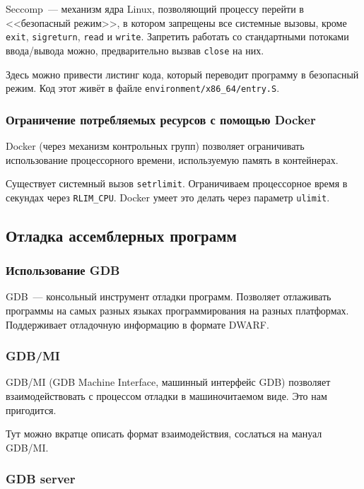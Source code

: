 \documentclass[a4paper,article,14pt]{extarticle}
\begin{document}
Seccomp~--- механизм ядра Linux, позволяющий процессу перейти в <<безопасный режим>>, в котором запрещены все системные вызовы, кроме \texttt{exit}, \texttt{sigreturn}, \texttt{read} и \texttt{write}. Запретить работать со стандартными потоками ввода/вывода можно, предварительно вызвав \texttt{close} на них.

Здесь можно привести листинг кода, который переводит программу в безопасный режим. Код этот живёт в файле \texttt{environment/x86\_64/entry.S}.

\subsubsection{Ограничение потребляемых ресурсов с помощью Docker}

Docker (через механизм контрольных групп) позволяет ограничивать использование процессорного времени, используемую память в контейнерах.

Существует системный вызов \texttt{setrlimit}. Ограничиваем процессорное время в секундах через \texttt{RLIM\_CPU}. Docker умеет это делать через параметр \texttt{ulimit}.

\subsection{Отладка ассемблерных программ}

\subsubsection{Использование GDB}

GDB~--- консольный инструмент отладки программ. Позволяет отлаживать программы на самых разных языках программирования на разных платформах. Поддерживает отладочную информацию в формате DWARF.

\subsubsection{GDB/MI}

GDB/MI (GDB Machine Interface, машинный интерфейс GDB) позволяет взаимодействовать с процессом отладки в машиночитаемом виде. Это нам пригодится.

Тут можно вкратце описать формат взаимодействия, сослаться на мануал GDB/MI.

\subsubsection{GDB server}
\end{document}
